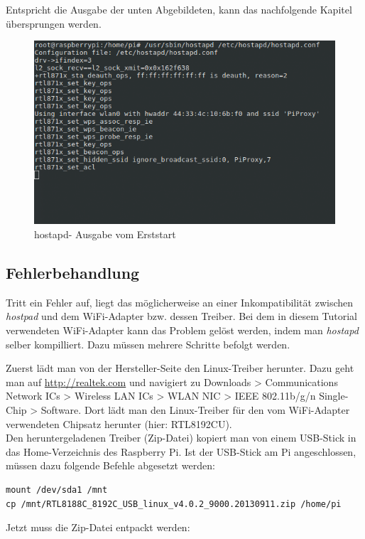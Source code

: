 Entspricht die Ausgabe der unten Abgebildeten, kann das nachfolgende Kapitel übersprungen werden.

\begin{figure}[h]
\centering
\includegraphics[scale=0.7]{images/hostapd_firststart}
\caption{hostapd- Ausgabe vom Erststart}
\end{figure}

\subsection{Fehlerbehandlung}
Tritt ein Fehler auf, liegt das möglicherweise an einer Inkompatibilität zwischen \textit{hostpad} und dem WiFi-Adapter bzw. dessen Treiber. Bei dem in diesem Tutorial verwendeten WiFi-Adapter kann das Problem gelöst werden, indem man \textit{hostapd} selber kompilliert. Dazu müssen mehrere Schritte befolgt werden.

Zuerst lädt man von der Hersteller-Seite den Linux-Treiber herunter. Dazu geht man auf \url{http://realtek.com} und navigiert zu Downloads > Communications Network ICs > Wireless LAN ICs > WLAN NIC > IEEE 802.11b/g/n Single-Chip > Software. Dort lädt man den Linux-Treiber für den vom  WiFi-Adapter verwendeten Chipsatz herunter (hier: RTL8192CU).
\\
Den heruntergeladenen Treiber (Zip-Datei) kopiert man von einem USB-Stick in das Home-Verzeichnis des Raspberry Pi. Ist der USB-Stick am Pi angeschlossen, müssen dazu folgende Befehle abgesetzt werden:

\begin{lstlisting}
mount /dev/sda1 /mnt
cp /mnt/RTL8188C_8192C_USB_linux_v4.0.2_9000.20130911.zip /home/pi
\end{lstlisting} 

Jetzt muss die Zip-Datei entpackt werden:


